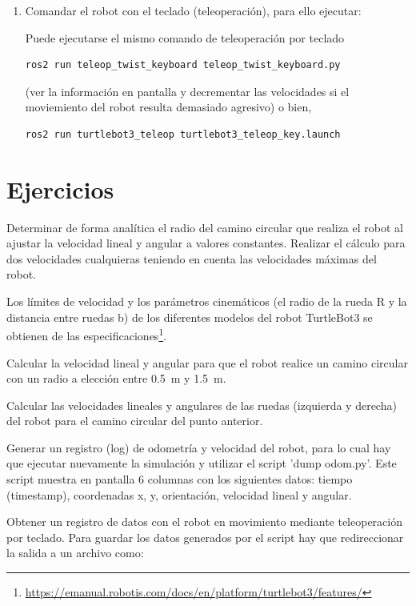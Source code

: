 \documentclass[tp]{lcc}
\begin{document}
\begin{enumerate}
\item Comandar el robot con el teclado (teleoperación), para ello ejecutar:

Puede ejecutarse el mismo comando de teleoperación por teclado
\begin{lstlisting}[style=bash] 
ros2 run teleop_twist_keyboard teleop_twist_keyboard.py
\end{lstlisting}
(ver la información en pantalla y decrementar las velocidades si el moviemiento del robot
resulta demasiado agresivo)
o bien,
\begin{lstlisting}[style=bash] 
ros2 run turtlebot3_teleop turtlebot3_teleop_key.launch
\end{lstlisting}

\end{enumerate}


\section{Ejercicios}

\ejercicio  Determinar de forma analítica el radio del camino circular que realiza el robot al ajustar la velocidad lineal y angular a valores constantes. Realizar el cálculo para dos velocidades cualquieras teniendo en cuenta las velocidades máximas del robot.

\nota Los límites de velocidad y los parámetros cinemáticos (el radio de la rueda R y la distancia entre ruedas b) de los diferentes modelos del robot TurtleBot3 se obtienen de las especificaciones\footnote{\url{https://emanual.robotis.com/docs/en/platform/turtlebot3/features/}}.

\ejercicio  Calcular la velocidad lineal y angular para que el robot realice un camino circular con un radio a elección entre \SI{0.5}{\meter} y \SI{1.5}{\meter}.

\ejercicio  Calcular las velocidades lineales y angulares de las ruedas (izquierda y derecha) del robot para el camino circular del punto anterior.

\ejercicio Generar un registro (log) de odometría y velocidad del robot, para lo cual hay que ejecutar nuevamente
la simulación y utilizar el script ’dump odom.py’. Este script muestra en pantalla 6 columnas con los siguientes datos: tiempo (timestamp), coordenadas x, y, orientación, velocidad lineal y angular.

\ejercicio Obtener un registro de datos con el robot en movimiento mediante teleoperación por teclado. Para guardar los datos generados por el script hay que redireccionar la salida a un archivo como:
\end{document}
